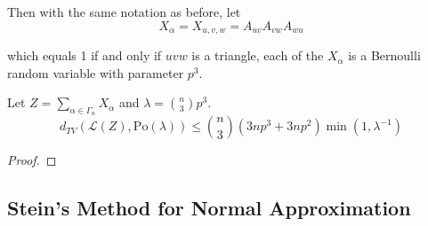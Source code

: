 \documentclass{article}
\begin{document}
Then with the same notation as before, let 
$$
X_{\alpha}=X_{u,v,w} = A_{u v} A_{v w} A_{w u}
$$

which equals 1 if and only if $uvw$ is a triangle, each of the $X_\alpha$ is a Bernoulli random variable with parameter $p^3$. 

\begin{theorem}
    Let $Z = \sum_{\alpha \in \Gamma_n} X_\alpha$ and $\lambda = \binom{n}{3}p^3$.
    \begin{equation*}
        d_{TV}(\mathcal{L}(Z), \text{Po}(\lambda)) \leq \binom{n}{3}(3np^3 + 3np^2) \min (1, \lambda^{-1})
    \end{equation*}
\end{theorem}

\begin{proof}
    
\end{proof}


\subsection{Stein's Method for Normal Approximation}





\end{document}
